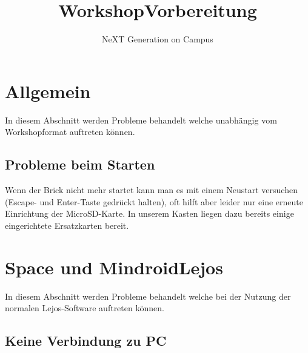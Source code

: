 \documentclass[
	ngerman,
	IMRAD=false,
	DIV=calc,
	paper=a4,
	marginpar=false,
	accentcolor=1c,%
	]{tudapub}
\begin{document}




\title{Workshop\newline Vorbereitung}
\subtitle{NeXT Generation on Campus}
\date{}



\maketitle
\newpage

\tableofcontents

\section{Allgemein}
In diesem Abschnitt werden Probleme behandelt welche unabhängig vom Workshopformat auftreten können.

\subsection{Probleme beim Starten}

Wenn der Brick nicht mehr startet kann man es mit einem Neustart versuchen (Escape- und Enter-Taste gedrückt halten), oft hilft aber leider nur eine erneute Einrichtung der MicroSD-Karte. In unserem Kasten liegen dazu bereits einige eingerichtete Ersatzkarten bereit.

\section{Space und MindroidLejos}
In diesem Abschnitt werden Probleme behandelt welche bei der Nutzung der normalen Lejos-Software auftreten können.

\subsection{Keine Verbindung zu PC}
\end{document}
